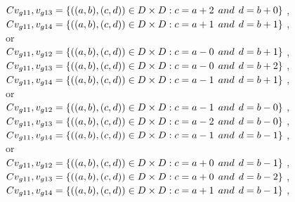 \\$C{v_{g11},v_{g13}}=\{((a,b),(c,d))\in D\times D: c = a + 2\hspace{1ex} and \hspace{1ex}  d = b + 0 \}$ , 
\\$C{v_{g11},v_{g14}}=\{((a,b),(c,d))\in D\times D: c = a + 1\hspace{1ex} and \hspace{1ex}  d = b + 1 \}$ , 
\\or
\\$C{v_{g11},v_{g12}}=\{((a,b),(c,d))\in D\times D: c = a - 0\hspace{1ex} and \hspace{1ex}  d = b + 1 \}$ , 
\\$C{v_{g11},v_{g13}}=\{((a,b),(c,d))\in D\times D: c = a - 0\hspace{1ex} and \hspace{1ex}  d = b + 2 \}$ , 
\\$C{v_{g11},v_{g14}}=\{((a,b),(c,d))\in D\times D: c = a - 1\hspace{1ex} and \hspace{1ex}  d = b + 1 \}$ , 
\\or
\\$C{v_{g11},v_{g12}}=\{((a,b),(c,d))\in D\times D: c = a - 1\hspace{1ex} and \hspace{1ex}  d = b - 0 \}$ , 
\\$C{v_{g11},v_{g13}}=\{((a,b),(c,d))\in D\times D: c = a - 2\hspace{1ex} and \hspace{1ex}  d = b - 0 \}$ , 
\\$C{v_{g11},v_{g14}}=\{((a,b),(c,d))\in D\times D: c = a - 1\hspace{1ex} and \hspace{1ex}  d = b - 1 \}$ , 
\\or
\\$C{v_{g11},v_{g12}}=\{((a,b),(c,d))\in D\times D: c = a + 0\hspace{1ex} and \hspace{1ex}  d = b - 1 \}$ , 
\\$C{v_{g11},v_{g13}}=\{((a,b),(c,d))\in D\times D: c = a + 0\hspace{1ex} and \hspace{1ex}  d = b - 2 \}$ , 
\\$C{v_{g11},v_{g14}}=\{((a,b),(c,d))\in D\times D: c = a + 1\hspace{1ex} and \hspace{1ex}  d = b - 1 \}$ , 
